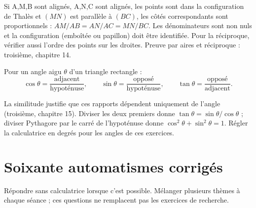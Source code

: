 \documentclass[11pt,a4paper,oneside]{book}
\begin{document}
Si A,M,B sont alignés, A,N,C sont alignés, les points sont dans la configuration de Thalès et $(MN)$ est parallèle à $(BC)$, les côtés correspondants sont proportionnels : $AM/AB=AN/AC=MN/BC$. Les dénominateurs sont non nuls et la configuration (emboîtée ou papillon) doit être identifiée. Pour la réciproque, vérifier aussi l'ordre des points sur les droites. Preuve par aires et réciproque : troisième, chapitre 14.

Pour un angle aigu $\theta$ d'un triangle rectangle :
\[
\cos\theta=\frac{\text{adjacent}}{\text{hypoténuse}},\qquad
\sin\theta=\frac{\text{opposé}}{\text{hypoténuse}},\qquad
\tan\theta=\frac{\text{opposé}}{\text{adjacent}}.
\]

La similitude justifie que ces rapports dépendent uniquement de l'angle (troisième, chapitre 15). Diviser les deux premiers donne $\tan\theta=\sin\theta/\cos\theta$ ; diviser Pythagore par le carré de l'hypoténuse donne $\cos^2\theta+\sin^2\theta=1$. Régler la calculatrice en degrés pour les angles de ces exercices.
\chapter{Soixante automatismes corrigés}
Répondre sans calculatrice lorsque c'est possible. Mélanger plusieurs thèmes à chaque séance ; ces questions ne remplacent pas les exercices de recherche.
\end{document}

